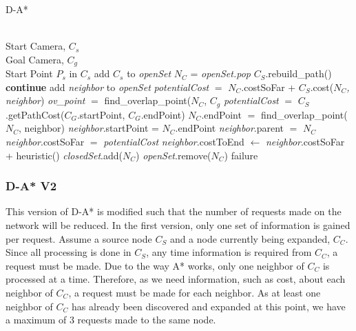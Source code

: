 \begin{algorithm}
\caption{D-A*}
\label{D-A*}
\begin{algorithmic}[1]
\REQUIRE \ \\
Start Camera, $C_s$ \\
Goal Camera, $C_g$ \\
Start Point $P_s$ in $C_s$
\STATE add $C_s$ to \textit{openSet}
	\STATE \textit{$N_C$} = \textit{openSet.pop}
		\RETURN $C_S$.rebuild\_path()
	\ENDIF
			\STATE \textbf{continue}
		\ENDIF
			\STATE add \textit{neighbor} to \textit{openSet}
		\ENDIF
		\STATE \textit{potentialCost} $=$ \textit{$N_C$}.costSoFar + $C_S$.cost(\textit{$N_C$, neighbor})
			\STATE \textit{ov\_point} $=$ find\_overlap\_point($N_C$, $C_g$
			\STATE \textit{potentialCost} $=$ $C_S$.getPathCost($C_G$.startPoint, $C_G$.endPoint)
		\ENDIF
			\STATE $N_C$.endPoint $=$ find\_overlap\_point($N_C$, neighbor)
			\STATE \textit{neighbor}.startPoint = $N_C$.endPoint
			\STATE \textit{neighbor}.parent $=$ \textit{$N_C$}
			\STATE \textit{neighbor}.costSoFar $=$ \textit{potentialCost}
			\STATE \textit{neighbor}.costToEnd $\leftarrow$ \textit{neighbor}.costSoFar + heuristic()
		\ENDIF		 
	\ENDFOR
	\STATE \textit{closedSet}.add(\textit{$N_C$})
	\STATE \textit{openSet}.remove(\textit{$N_C$})
\ENDWHILE
\RETURN failure
\end{algorithmic}
\end{algorithm}
\subsubsection{D-A* V2}
This version of D-A* is modified such that the number of requests made on the network will be reduced. In the first version, only one set of information is gained per request. Assume a source node $C_S$ and a node currently being expanded, $C_C$. Since all processing is done in $C_S$, any time information is required from $C_C$, a request must be made. Due to the way A* works, only one neighbor of $C_C$ is processed at a time. Therefore, as we need information, such as cost, about each neighbor of $C_C$, a request must be made for each neighbor. As at least one neighbor of $C_C$ has already been discovered and expanded at this point, we have a maximum of 3 requests made to the same node. 

